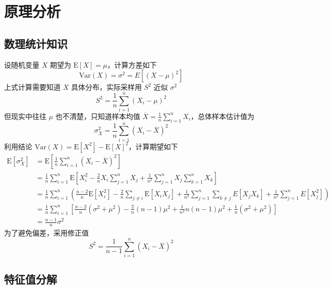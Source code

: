 \documentclass[12pt,AutoFakeBold]{article}
\begin{document}
\section{原理分析}

\subsection{数理统计知识}

设随机变量 $X$ 期望为 $\mathrm{E}[X]=\mu$，计算方差如下
%
\begin{equation}
\mathrm{Var}(X)=\sigma^2=E[(X-\mu)^2]
\end{equation}
%
上式计算需要知道 $X$ 具体分布，实际采样用 $S^2$ 近似 $\sigma^2$
%
\begin{equation}
S^2=\frac{1}{n}\sum_{i=1}^n\left(X_i-\mu\right)^2
\end{equation}
%
但现实中往往 $\mu$ 也不清楚，只知道样本均值 $\overline{X}=\frac{1}{n}\sum_{i=1}^nX_i$，总体样本估计值为
%
\begin{equation}
\sigma_X^2=\frac{1}{n}\sum_{i=1}^n\left(X_i-\overline{X}\right)^2
\end{equation}
%
利用结论 $\mathrm{Var}(X)=\mathrm{E}[X^2]-\mathrm{E}[X]^2$，计算期望如下
%
\begin{equation}
\begin{aligned}
\mathrm{E}[\sigma_X^2] &= \mathrm{E}\left[\frac{1}{n}\sum_{i=1}^n\left(X_i-\overline{X}\right)^2\right] \\
 &= \frac{1}{n}\sum_{i=1}^n\mathrm{E}\left[X_i^2-\frac{2}{n}X_i\sum_{j=1}^nX_j+\frac{1}{n^2}\sum_{j=1}^nX_j\sum_{k=1}^nX_k\right] \\
 &= \frac{1}{n}\sum_{i=1}^{n}\left(\frac{n-2}{n}\mathrm{E}[X_i^2]-\frac{2}{n}\sum_{j\neq i}\mathrm{E}[X_iX_j]+\frac{1}{n^2}\sum_{j=1}^n\sum_{k\neq j}E[X_jX_k]+\frac{1}{n^2}\sum_{j=1}^nE[X_j^2]\right) \\
 &= \frac{1}{n}\sum_{i=1}^{n}\left[\frac{n-2}{n}(\sigma^2+\mu^2)-\frac{2}{n}(n-1)\mu^2+\frac{1}{n^2}n(n-1)\mu^2+\frac{1}{n}(\sigma^2+\mu^2)\right] \\
 &= \frac{n-1}{n}\sigma^2
\end{aligned}
\end{equation}
%
为了避免偏差，采用修正值
%
\begin{equation}
S^2=\frac{1}{n-1}\sum_{i=1}^n\left(X_i-\overline{X}\right)^2
\end{equation}
%

\subsection{特征值分解}
\end{document}
